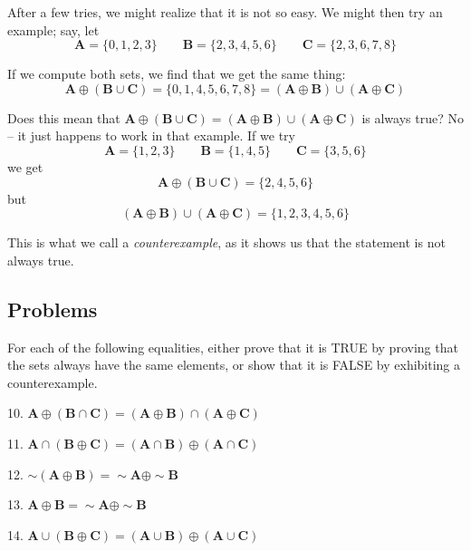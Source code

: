 \documentclass{article}
\newcommand\A{\mathbf A}
\newcommand\B{\mathbf B}
\newcommand\C{\mathbf C}
\newcommand{\0}{\mathbf 0}
\newcommand{\1}{\mathbf 1}
\begin{document}
After a few tries, we might realize that it is not so easy. We might then try an example; say, let
\begin{equation*}
\A = \{0,1,2,3\} \qquad \B = \{2,3,4,5,6\} \qquad \C = \{2,3,6,7,8\}
\end{equation*}

If we compute both sets, we find that we get the same thing:
\begin{equation*}
\A \oplus (\B \cup \C) = \{0,1,4,5,6,7,8\} = (\A \oplus \B) \cup (\A \oplus \C)
\end{equation*}

Does this mean that $\A \oplus (\B \cup \C) = (\A \oplus \B) \cup (\A \oplus \C)$ is always true? No -- it just happens to work in that example. If we try
\begin{equation*}
\A = \{1,2,3\} \qquad \B = \{1,4,5\} \qquad \C = \{3,5,6\}
\end{equation*}
we get
\begin{equation*}
\A \oplus (\B \cup \C) = \{2,4,5,6\}
\end{equation*}
but
\begin{equation*}
(\A \oplus \B) \cup (\A \oplus \C) = \{1,2,3,4,5,6\}
\end{equation*}

This is what we call a \emph{counterexample}, as it shows us that the statement is not always true.


\subsection*{Problems}

For each of the following equalities, either prove that it is TRUE by proving that the sets always have the same elements, or show that it is FALSE by exhibiting a counterexample.
\begin{description}
  \item{10.} $\A \oplus (\B \cap \C) = (\A \oplus \B) \cap (\A \oplus \C)$
  \item{11.} $\A \cap (\B \oplus \C) = (\A \cap \B) \oplus (\A \cap \C)$
  \item{12.} $\sim (\A \oplus \B) = \sim \A \oplus \sim \B$
  \item{13.} $\A \oplus \B = \sim \A \oplus \sim \B$
  \item{14.} $\A \cup (\B \oplus \C) = (\A \cup \B) \oplus (\A \cup \C)$
\end{description}




\newpage
\end{document}
